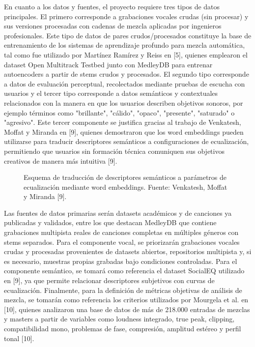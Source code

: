 \documentclass[12pt]{article}
\begin{document}
En cuanto a los datos y fuentes, el proyecto requiere tres tipos de datos principales. El primero corresponde a grabaciones vocales crudas (sin procesar) y sus versiones procesadas con cadenas de mezcla aplicadas por ingenieros profesionales. Este tipo de datos de pares crudos/procesados constituye la base de entrenamiento de los sistemas de aprendizaje profundo para mezcla automática, tal como fue utilizado por Martínez Ramírez y Reiss en [5], quienes emplearon el dataset Open Multitrack Testbed junto con MedleyDB para entrenar autoencoders a partir de stems crudos y procesados. El segundo tipo corresponde a datos de evaluación perceptual, recolectados mediante pruebas de escucha con usuarios y el tercer tipo corresponde a datos semánticos y contextuales relacionados con la manera en que los usuarios describen objetivos sonoros, por ejemplo términos como "brillante", "cálido", "opaco", "presente", "saturado" o "agresivo". Este tercer componente se justifica gracias al trabajo de Venkatesh, Moffat y Miranda en [9], quienes demostraron que los word embeddings pueden utilizarse para traducir descriptores semánticos a configuraciones de ecualización, permitiendo que usuarios sin formación técnica comuniquen sus objetivos creativos de manera más intuitiva [9].

\begin{figure}[h!]
\centering
\caption{Esquema de traducción de descriptores semánticos a parámetros de ecualización mediante word embeddings. Fuente: Venkatesh, Moffat y Miranda [9].}
\label{fig:fig8}
\end{figure}

Las fuentes de datos primarias serán datasets académicos y de canciones ya publicadas y validados, entre los que destacan MedleyDB que contiene grabaciones multipista reales de canciones completas en múltiples géneros con stems separados. Para el componente vocal, se priorizarán grabaciones vocales crudas y procesadas provenientes de datasets abiertos, repositorios multipista y, si es necesario, muestras propias grabadas bajo condiciones controladas. Para el componente semántico, se tomará como referencia el dataset SocialEQ utilizado en [9], ya que permite relacionar descriptores subjetivos con curvas de ecualización. Finalmente, para la definición de métricas objetivas de análisis de mezcla, se tomarán como referencia los criterios utilizados por Mourgela et al. en [10], quienes analizaron una base de datos de más de 218.000 entradas de mezclas y masters a partir de variables como loudness integrado, true peak, clipping, compatibilidad mono, problemas de fase, compresión, amplitud estéreo y perfil tonal [10].
\end{document}
